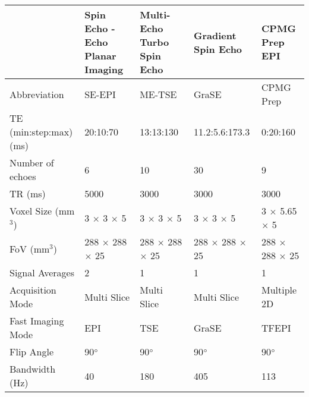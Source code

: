 \begin{table}[H]
	\centering
	\begin{adjustbox}{width=1.2\textwidth, center}
	\begin{tabularx}{1.25\textwidth}{X|X|X|X|X}
		                                                     & Spin Echo - Echo Planar Imaging & Multi-Echo Turbo Spin Echo & Gradient Spin Echo & CPMG \ttwo Prep EPI \\ \hline
		Abbreviation                                         & SE-EPI                          & ME-TSE                     & GraSE              & CPMG \ttwo Prep     \\ \hline
		TE (min:step:max) (ms)                               & 20:10:70                        & 13:13:130                  & 11.2:5.6:173.3     & 0:20:160            \\ \hline
		Number of   echoes                                   & 6                               & 10                         & 30                 & 9                   \\ \hline
		TR (ms)                                              & 5000                            & 3000                       & 3000               & 3000                \\ \hline
		Voxel Size   (mm$^3$)                                & 3 $\times$ 3 $\times$ 5         & 3 $\times$ 3 $\times$ 5    &3 $\times$ 3 $\times$ 5 &3 $\times$ 5.65 $\times$ 5\\ \hline
		FoV (mm$^3$)                                         & 288 $\times$ 288 $\times$ 25    & 288 $\times$ 288 $\times$ 25   &288 $\times$ 288 $\times$ 25&288 $\times$ 288 $\times$ 25\\ \hline
		Signal   Averages                                    & 2                               & 1                          & 1                  & 1                   \\ \hline
		Acquisition Mode                                     & Multi Slice                     & Multi Slice                & Multi Slice        & Multiple 2D         \\ \hline
		Fast   Imaging Mode                                  & EPI                             & TSE                        & GraSE              & TFEPI               \\ \hline
		Flip Angle                                           & 90$\degree$                     & 90$\degree$                & 90$\degree$        & 90$\degree$         \\ \hline
		Bandwidth   (Hz)                                     & 40                              & 180                        & 405                & 113                 \\ \hline

\end{tabularx}
\end{adjustbox}
\end{table}
